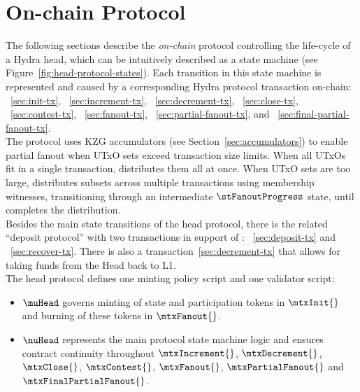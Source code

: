\clearpage
\section{On-chain Protocol}\label{sec:on-chain}

\noindent The following sections describe the \emph{on-chain} protocol
controlling the life-cycle of a Hydra head, which can be intuitively described
as a state machine (see Figure~\ref{fig:head-protocol-states}). Each transition
in this state machine is represented and caused by a corresponding Hydra
protocol transaction
on-chain: \mtxInit{}~\ref{sec:init-tx}, \mtxIncrement{}~\ref{sec:increment-tx}, \mtxDecrement{}~\ref{sec:decrement-tx}, \mtxClose{}~\ref{sec:close-tx}, \mtxContest{}~\ref{sec:contest-tx}, \mtxFanout{}~\ref{sec:fanout-tx}, \mtxPartialFanout{}~\ref{sec:partial-fanout-tx}, and \mtxFinalPartialFanout{}~\ref{sec:final-partial-fanout-tx}. \\

\noindent The protocol uses KZG accumulators (see Section~\ref{sec:accumulators}) to enable partial fanout when UTxO sets exceed transaction size limits. When all UTxOs fit in a single transaction, \mtxFanout{} distributes them all at once. When UTxO sets are too large, \mtxPartialFanout{} distributes subsets across multiple transactions using membership witnesses, transitioning through an intermediate $\stFanoutProgress$ state, until \mtxFinalPartialFanout{} completes the distribution. \\

\noindent Besides the main state transitions of the head protocol, there is
the related ``deposit protocol'' with two transactions in support of
\mtxIncrement{}: \mtxDeposit{}~\ref{sec:deposit-tx} and \mtxRecover{}~\ref{sec:recover-tx}.
There is also a \mtxDecrement{} transaction~\ref{sec:decrement-tx} that allows for taking funds from the Head back to L1. \\


\noindent The head protocol defines one minting policy script and one
validator script:
\begin{itemize}
	\item $\muHead$ governs minting of state and participation tokens in
	      $\mtxInit{}$ and burning of these tokens in $\mtxFanout{}$.
	\item $\nuHead$ represents the main protocol state machine logic and ensures
	      contract continuity throughout $\mtxIncrement{}$, $\mtxDecrement{}$,
	      $\mtxClose{}$, $\mtxContest{}$, $\mtxFanout{}$, $\mtxPartialFanout{}$ and $\mtxFinalPartialFanout{}$.
\end{itemize}


